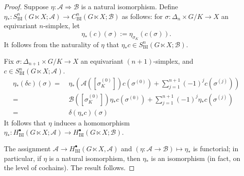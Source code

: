 \documentclass[10pt,a4paper]{amsart}
\newcommand{\BI}{{\operatorname{BI}}} %
\newcommand{\calA}{{\mathcal{A}}}
\newcommand{\calB}{{\mathcal{B}}}
\begin{document}
    \begin{proof}
        Suppose $\eta\colon\calA\Rightarrow\calB$ is a natural isomorphism.  Define $\eta_*\colon S_\BI^n(G\ltimes X;\calA)\to C_\BI^n(G\ltimes X;\calB)$ as follows: for $\sigma\colon\Delta_n\times G/K\to X$ an equivariant $n$-simplex, let $$\eta_*(c)(\sigma):=\eta_{\sigma_K}(c(\sigma)).$$  It follows from the naturality of $\eta$ that $\eta_*c\in S_\BI^n(G\ltimes X;\calB)$. 

        Fix $\sigma\colon\Delta_{n+1}\times G/K\to X$ an equivariant $(n+1)$-simplex, and $c\in S_\BI^n(G\ltimes X;\calA)$.
        \begin{align*}
            \eta_*(\delta c)(\sigma)  =&~ \eta_*\left(\calA([\sigma_K^{(0)}])c(\sigma^{(0)})+\sum_{j=1}^{n+1}(-1)^jc(\sigma^{(j)})\right) \\
                =&~ \calB([\sigma_K^{(0)}])\eta_*c(\sigma^{(0)})+\sum_{j=1}^{n+1}(-1)^j\eta_*c(\sigma^{(j)}) \\
                =&~ \delta(\eta_*c)(\sigma)
        \end{align*}
        It follows that $\eta$ induces a homomorphism $\eta_*\colon H_\BI^\bullet(G\ltimes X;\calA)\to H_\BI^\bullet(G\ltimes X;\calB).$  

        The assignment $\calA\to H^\bullet_\BI(G\ltimes X,\calA)$ and $(\eta\colon\calA\to\calB)\mapsto\eta_*$ is functorial; in particular, if $\eta$ is a natural isomorphism, then $\eta_*$ is an isomorphism (in fact, on the level of cochains).  The result follows.
    \end{proof}
\end{document}
